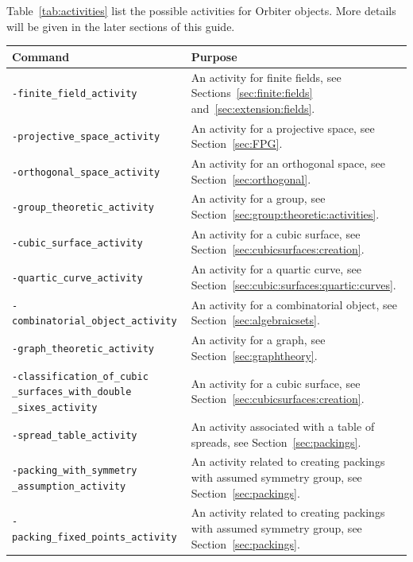  
Table~\ref{tab:activities} list the possible activities for Orbiter objects. 
More details will be given in the later sections of this guide.
\begin{table}
	\begin{center}
	\begin{tabular}{|p{7cm}|p{7cm}|}
		\hline
		Command  & Purpose \\
		\hline
		\hline
		\verb'-finite_field_activity' &  
		An activity for finite fields,  
		see Sections~\ref{sec:finite:fields} and~\ref{sec:extension:fields}.\\
		\hline
		\verb'-projective_space_activity' &  
		An activity for a projective space,  
		see Section~\ref{sec:FPG}.\\
		\hline
		\verb'-orthogonal_space_activity' &  
		An activity for an orthogonal space, 
		see Section~\ref{sec:orthogonal}.\\
		\hline
		\verb'-group_theoretic_activity' &  
		An activity for a group,  
		see Section~\ref{sec:group:theoretic:activities}.\\
		\hline
		\verb'-cubic_surface_activity' &  
		An activity for a cubic surface,  
		see Section~\ref{sec:cubicsurfaces:creation}.\\
		\hline
		\verb'-quartic_curve_activity' &  
		An activity for a quartic curve, 
		see Section~\ref{sec:cubic:surfaces:quartic:curves}.\\
		\hline
		\verb'-combinatorial_object_activity' &  
		An activity for a combinatorial object,  
		see Section~\ref{sec:algebraicsets}.\\
		\hline
		\verb'-graph_theoretic_activity' &  
		An activity for a graph,  
		see Section~\ref{sec:graphtheory}.\\
		\hline
		\verb'-classification_of_cubic' \verb'_surfaces_with_double' \verb'_sixes_activity' &  
		An activity for a cubic surface,  
		see Section~\ref{sec:cubicsurfaces:creation}.\\
		\hline
		\verb'-spread_table_activity' &  
		An activity associated with a table of spreads, 
		see Section~\ref{sec:packings}.\\
		\hline
		\verb'-packing_with_symmetry' \verb'_assumption_activity' &  
		An activity related to creating packings with assumed symmetry group, 
		see Section~\ref{sec:packings}.\\
		\hline
		\verb'-packing_fixed_points_activity' &  
		An activity related to creating packings with assumed symmetry group, 
		see Section~\ref{sec:packings}.\\

\end{tabular}
\end{center}
\end{table}
